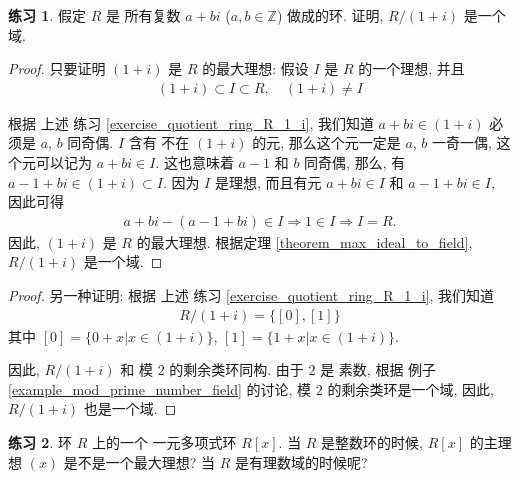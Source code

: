\documentclass[utf8]{ctexbook}
\theoremstyle{definition}
\newtheorem{exercise}{练习}[section]
\begin{document}
\begin{exercise}
假定 $R$ 是 所有复数 $a+bi$ ($a,b \in \mathbb{Z}$) 做成的环. 证明, $R/ (1+i)$ 是一个域.
\end{exercise}

\begin{proof}
只要证明 $(1+i)$ 是 $R$ 的最大理想: 假设 $I$ 是 $R$ 的一个理想, 并且
\begin{align*}
(1+i) \subset I \subset R, \quad  (1+i) \neq I
\end{align*}

根据 上述 练习 \ref{exercise_quotient_ring_R_1_i}, 我们知道 $a+bi \in (1+i)$ 必须是 $a$, $b$ 同奇偶. $I$ 含有 不在 $(1+i)$ 的元, 那么这个元一定是 $a$, $b$ 一奇一偶, 这个元可以记为 $a + bi \in I$. 这也意味着 $a-1 $ 和 $b$ 同奇偶, 那么, 有 $a - 1 + b i \in (1+i) \subset I $. 因为 $I$ 是理想, 而且有元 $a + bi \in I$ 和 $a -1 + bi \in I$, 因此可得
\begin{align*}
a + bi - (a-1 +bi) \in I \Longrightarrow 1 \in I \Longrightarrow I = R.
\end{align*}
因此, $(1+i)$ 是 $R$ 的最大理想. 根据定理 \ref{theorem_max_ideal_to_field}, $R/(1+i)$ 是一个域.
\end{proof}

\begin{proof}
另一种证明: 根据 上述 练习 \ref{exercise_quotient_ring_R_1_i}, 我们知道 
\begin{align*}
R/(1+i) = \{ [0], [1] \}
\end{align*}
其中 $[0] = \{0 + x| x \in (1+i)\}$, $[1] = \{1 + x| x \in (1+i)\}$. 

因此, $R/(1+i)$ 和 模 $2$ 的剩余类环同构. 由于 $2$ 是 素数, 根据 例子 \ref{example_mod_prime_number_field} 的讨论, 模 $2$ 的剩余类环是一个域, 因此, $R/(1+i)$ 也是一个域.
\end{proof}


\begin{exercise}
环 $R$ 上的一个 一元多项式环 $R[x]$. 当 $R$ 是整数环的时候, $R[x]$ 的主理想 $(x)$ 是不是一个最大理想? 当 $R$ 是有理数域的时候呢?
\end{exercise}
\end{document}
